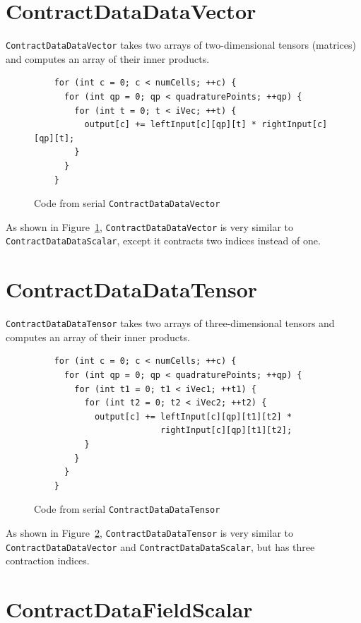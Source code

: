 \section{ContractDataDataVector}
\texttt{ContractDataDataVector} takes two arrays of two-dimensional tensors
(matrices) and computes an array of their inner products.
\begin{figure}[ht]
    \begin{lstlisting}
    for (int c = 0; c < numCells; ++c) {
      for (int qp = 0; qp < quadraturePoints; ++qp) {
        for (int t = 0; t < iVec; ++t) {
          output[c] += leftInput[c][qp][t] * rightInput[c][qp][t];
        }
      }
    }
    \end{lstlisting}
\caption{Code from serial \texttt{ContractDataDataVector}
\label{lst:ContractDataDataVectorSerial}} 
\end{figure}

As shown in Figure~\ref{lst:ContractDataDataVectorSerial},
\texttt{ContractDataDataVector} is very similar to
\texttt{ContractDataDataScalar}, except it contracts two indices instead of
one.

\section{ContractDataDataTensor}\label{section:ContractDataDataTensor}
\texttt{ContractDataDataTensor} takes two arrays of three-dimensional tensors
and computes an array of their inner products.

\begin{figure}[ht]
    \begin{lstlisting}
    for (int c = 0; c < numCells; ++c) {
      for (int qp = 0; qp < quadraturePoints; ++qp) {
        for (int t1 = 0; t1 < iVec1; ++t1) {
          for (int t2 = 0; t2 < iVec2; ++t2) {
            output[c] += leftInput[c][qp][t1][t2] * 
                         rightInput[c][qp][t1][t2];
          }
        }
      }
    }
    \end{lstlisting}
\caption{Code from serial \texttt{ContractDataDataTensor}
\label{lst:ContractDataDataTensorSerial}} 
\end{figure}

As shown in Figure~\ref{lst:ContractDataDataTensorSerial},
\texttt{ContractDataDataTensor} is very similar to\\
\texttt{ContractDataDataVector} and \texttt{ContractDataDataScalar}, but has
three contraction indices.

\section{ContractDataFieldScalar}

